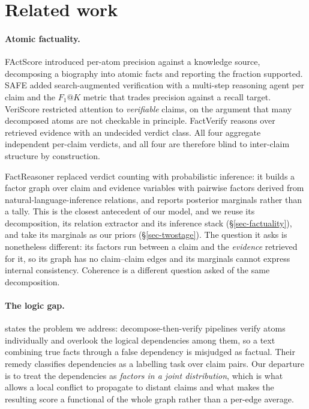 \section{Related work}
\label{sec-related}

\paragraph{Atomic factuality.} FActScore \citep{factscore} introduced per-atom precision against a
knowledge source, decomposing a biography into atomic facts and reporting the fraction supported.
SAFE \citep{safe} added search-augmented verification with a multi-step reasoning agent per claim
and the $F_1@K$ metric that trades precision against a recall target. VeriScore
\citep{veriscore} restricted attention to \emph{verifiable} claims, on the argument that many
decomposed atoms are not checkable in principle. FactVerify \citep{factverify} reasons over
retrieved evidence with an undecided verdict class. All four aggregate independent per-claim
verdicts, and all four are therefore blind to inter-claim structure by construction.

FactReasoner \citep{factreasoner} replaced verdict counting with probabilistic inference: it
builds a factor graph over claim and evidence variables with pairwise factors derived from
natural-language-inference relations, and reports posterior marginals rather than a tally. This is
the closest antecedent of our model, and we reuse its decomposition, its relation extractor and
its inference stack (\S\ref{sec-factuality}), and take its marginals as our priors
(\S\ref{sec-twostage}). The question it asks is nonetheless different: its factors run between a
claim and the \emph{evidence} retrieved for it, so its graph has no claim--claim edges and its
marginals cannot express internal consistency. Coherence is a different question asked of the same
decomposition.

\paragraph{The logic gap.} \citet{lorefact} states the problem we address: decompose-then-verify
pipelines verify atoms individually and overlook the logical dependencies among them, so a text
combining true facts through a false dependency is misjudged as factual. Their remedy classifies
dependencies as a labelling task over claim pairs. Our departure is to treat the dependencies as
\emph{factors in a joint distribution}, which is what allows a local conflict to propagate to
distant claims and what makes the resulting score a functional of the whole graph rather than a
per-edge average.

